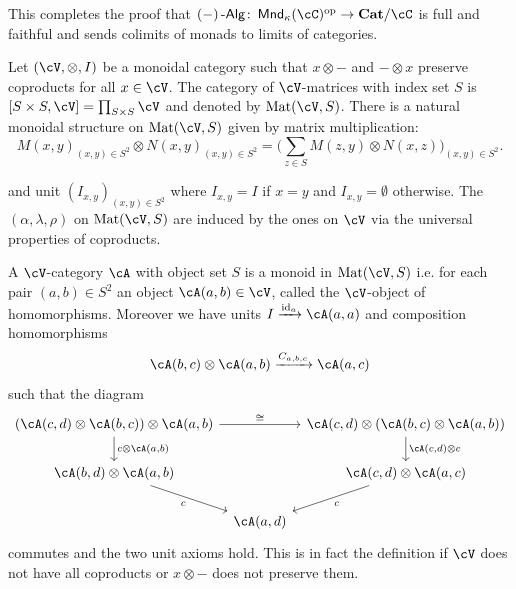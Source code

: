 \documentclass[a4paper,11pt,oneside,openany]{scrbook}
\begin{document}
\begin{rmk}
    This completes the proof that $ (-)\Alg \from \Mnd_\kappa(\cC)^{\text{op}} \to \Cat/\cC$ is full and faithful and sends colimits of monads to limits of categories.
\end{rmk}
Let $ (\cV,\otimes, I) $ be a monoidal category such that $ x\otimes - $ and $ -\otimes x $ preserve coproducts for all $ x\in\cV$.
The category of $\cV$-matrices with index set $ S $ is $ [S\times S,\cV] =\prod_{S\times S}\cV $ and denoted by $ \Mat(\cV ,     S) $. There is a natural monoidal structure on $ \Mat(\cV,S) $ given by matrix multiplication:
\begin{displaymath}
    M(x,y)_{(x,y) \in S^2} \otimes N(x,y)_{(x,y) \in S^2} = \Big(\sum_{z\in S} M(z,y)\otimes N(x,z) \Big)_{(x,y)\in S^2}.
\end{displaymath}

and unit $ (I_{x,y})_{(x,y) \in S^2} $ where $ I_{x,y}= I $ if $ x = y $ and $ I_{x,y} = \emptyset $ otherwise.
The $ (\alpha,\lambda,\rho) $ on $ \Mat(\cV , S) $ are induced by the ones on $\cV$ via the universal properties of coproducts.

\begin{defn}
    A $\cV$-category $ \cA $ with object set $ S $ is a monoid in $ \Mat(\cV,S) $ 
    i.e. for each pair $ (a,b) \in S^2 $ an object $ \cA(a,b) \in\cV$, called the $\cV$-object of homomorphisms.
    Moreover we have units $ I\xrightarrow{\id_a} \cA(a,a) $ and composition homomorphisms
    \begin{displaymath}
    \cA(b,c) \otimes \cA(a,b) \xrightarrow{C_{a,b,c}} \cA(a,c)
    \end{displaymath}
    such that the diagram
\begin{displaymath}
    \begin{tikzcd}[column sep=tiny]
    (\cA(c,d)\otimes \cA(b,c)) \otimes \cA(a,b)
    \arrow[d,"{c\otimes \cA(a,b)}"]\arrow[rr, "\cong"]
    &&
    \cA(c,d) \otimes (\cA(b,c) \otimes \cA(a,b) )  
    \arrow[d,"{\cA(c,d)\otimes c}"]\\
    \cA(b,d)\otimes \cA(a,b)
    \arrow[rd, "c"']
    &&
    \cA(c,d)\otimes \cA(a,c)
    \arrow[ld, "c"]
    \\
    & \cA(a,d)
    \end{tikzcd}
\end{displaymath}
commutes and the two unit axioms hold.
This is in fact the definition if $\cV$ does not have all coproducts or $ x\otimes - $ does not preserve them.
\end{defn}
\end{document}
